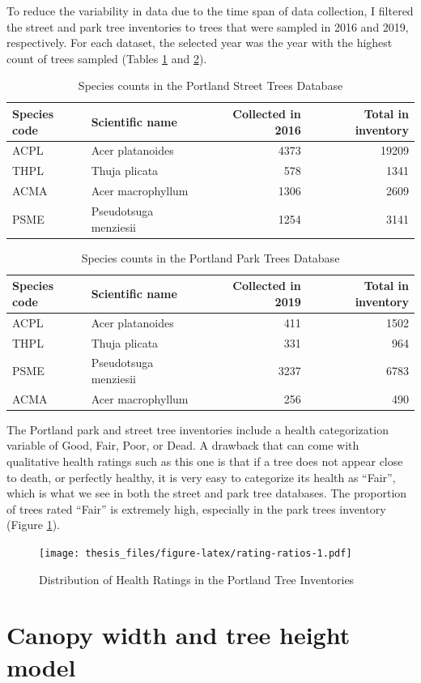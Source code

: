\documentclass[12pt,twoside]{reedthesis}
\begin{document}
To reduce the variability in data due to the time span of data collection, I filtered the street and park tree inventories to trees that were sampled in 2016 and 2019, respectively. For each dataset, the selected year was the year with the highest count of trees sampled (Tables \ref{tab:streettable} and \ref{tab:parktable}).
\begin{table}

\caption[Species counts in Street Trees Database]{\label{tab:streettable}Species counts in the Portland Street Trees Database}
\centering
\begin{tabular}[t]{llrr}
\toprule
Species code & Scientific name & Collected in 2016 & Total in inventory\\
\midrule
ACPL & Acer platanoides & 4373 & 19209\\
THPL & Thuja plicata & 578 & 1341\\
ACMA & Acer macrophyllum & 1306 & 2609\\
PSME & Pseudotsuga menziesii & 1254 & 3141\\
\bottomrule
\end{tabular}
\end{table}
\begin{table}

\caption[Species counts in Park Trees Database]{\label{tab:parktable}Species counts in the Portland Park Trees Database}
\centering
\begin{tabular}[t]{llrr}
\toprule
Species code & Scientific name & Collected in 2019 & Total in inventory\\
\midrule
ACPL & Acer platanoides & 411 & 1502\\
THPL & Thuja plicata & 331 & 964\\
PSME & Pseudotsuga menziesii & 3237 & 6783\\
ACMA & Acer macrophyllum & 256 & 490\\
\bottomrule
\end{tabular}
\end{table}
The Portland park and street tree inventories include a health categorization variable of Good, Fair, Poor, or Dead. A drawback that can come with qualitative health ratings such as this one is that if a tree does not appear close to death, or perfectly healthy, it is very easy to categorize its health as ``Fair'', which is what we see in both the street and park tree databases. The proportion of trees rated ``Fair'' is extremely high, especially in the park trees inventory (Figure \ref{fig:rating-ratios}).
\begin{figure}
\centering
\texttt{[image: thesis\_files/figure-latex/rating-ratios-1.pdf]}
\caption{\label{fig:rating-ratios}Distribution of Health Ratings in the Portland Tree Inventories}
\end{figure}
\hypertarget{canopy-width-and-tree-height-model}{%
\section{Canopy width and tree height model}\label{canopy-width-and-tree-height-model}}
\end{document}
